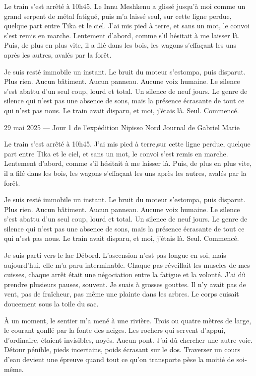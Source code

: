 Le train s’est arrêté à 10h45. Le Innu Meshkenu a glissé jusqu’à moi comme un grand serpent de métal fatigué, puis m’a laissé seul, sur cette ligne perdue, quelque part entre Tika et le ciel. J’ai mis pied à terre, et sans un mot, le convoi s’est remis en marche. Lentement d’abord, comme s’il hésitait à me laisser là. Puis, de plus en plus vite, il a filé dans les bois, les wagons s’effaçant les uns après les autres, avalés par la forêt.

Je suis resté immobile un instant. Le bruit du moteur s’estompa, puis disparut. Plus rien. Aucun bâtiment. Aucun panneau. Aucune voix humaine. Le silence s’est abattu d’un seul coup, lourd et total. Un silence de neuf jours. Le genre de silence qui n’est pas une absence de sons, mais la présence écrasante de tout ce qui n’est pas nous. Le train avait disparu, et moi, j’étais là. Seul. Commencé.




29 mai 2025 — Jour 1 de l’expédition Nipisso Nord
Journal de Gabriel Marie

Le train s’est arrêté à 10h45. J’ai mis pied à terre,sur cette ligne perdue, quelque part entre Tika et le ciel, et sans un mot, le convoi s’est remis en marche. Lentement d’abord, comme s’il hésitait à me laisser là. Puis, de plus en plus vite, il a filé dans les bois, les wagons s’effaçant les uns après les autres, avalés par la forêt.

Je suis resté immobile un instant. Le bruit du moteur s’estompa, puis disparut. Plus rien. Aucun bâtiment. Aucun panneau. Aucune voix humaine. Le silence s’est abattu d’un seul coup, lourd et total. Un silence de neuf jours. Le genre de silence qui n’est pas une absence de sons, mais la présence écrasante de tout ce qui n’est pas nous. Le train avait disparu, et moi, j’étais là. Seul. Commencé.

Je suis parti vers le lac Débord. L’ascension n’est pas longue en soi, mais aujourd’hui, elle m’a paru interminable. Chaque pas réveillait les muscles de mes cuisses, chaque arrêt était une négociation entre la fatigue et la volonté. J’ai dû prendre plusieurs pauses, souvent. Je suais à grosses gouttes. Il n’y avait pas de vent, pas de fraîcheur, pas même une plainte dans les arbres. Le corps cuisait doucement sous la toile du sac.

À un moment, le sentier m’a mené à une rivière. Trois ou quatre mètres de large, le courant gonflé par la fonte des neiges. Les rochers qui servent d’appui, d’ordinaire, étaient invisibles, noyés. Aucun pont. J’ai dû chercher une autre voie. Détour pénible, pieds incertains, poids écrasant sur le dos. Traverser un cours d’eau devient une épreuve quand tout ce qu’on transporte pèse la moitié de soi-même.

